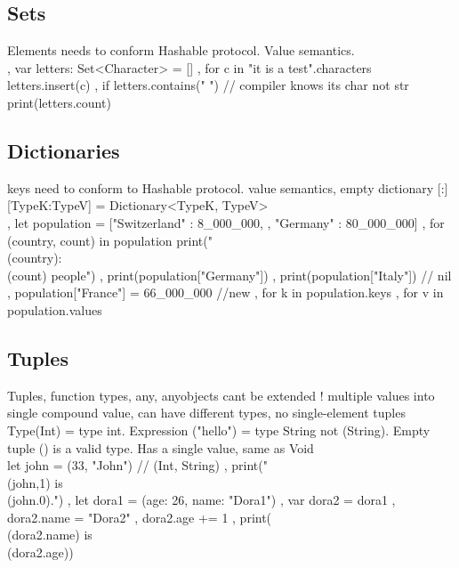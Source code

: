 \subsection{Sets}
Elements needs to conform Hashable protocol. Value semantics.\\
, var letters: Set<Character> = []
, for c in "it is a test".characters {
	letters.insert(c) }
, if letters.contains(" ") { // compiler knows its char not str
	print(letters.count) }

\subsection{Dictionaries}
keys need to conform to Hashable protocol. value semantics, empty dictionary [:]
[TypeK:TypeV] = Dictionary<TypeK, TypeV> \\
, let population = ["Switzerland" : 8\_000\_000,
, "Germany" : 80\_000\_000]
, for (country, count) in population {
	print("\\(country): \\(count) people") }
, print(population["Germany"])
, print(population["Italy"]) // nil
, population["France"] = 66\_000\_000 //new
, for k in population.keys { }
, for v in population.values { }

\subsection{Tuples}
Tuples, function types, any, anyobjects cant be extended !
multiple values into single compound value, can have different types, no single-element tuples Type(Int) = type int. Expression ("hello") = type String not (String). Empty tuple () is a valid type. Has a single value, same as Void \\
let john = (33, "John") // (Int, String)
, print("\\(john,1) is \\(john.0).")
, let dora1 = (age: 26, name: "Dora1")
, var dora2 = dora1
, dora2.name = "Dora2"
, dora2.age += 1
, print(\\(dora2.name) is \\(dora2.age))

